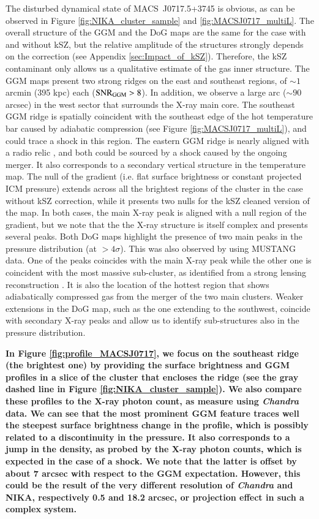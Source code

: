 \documentclass[twocolumn,traditabstract]{aa}
\begin{document}
The disturbed dynamical state of \mbox{MACS~J0717.5+3745} is obvious, as can be observed in Figure \ref{fig:NIKA_cluster_sample} and \ref{fig:MACSJ0717_multiL}. The overall structure of the GGM and the DoG maps are the same for the case with and without kSZ, but the relative amplitude of the structures strongly depends on the correction (see Appendix \ref{sec:Impact_of_kSZ}). Therefore, the kSZ contaminant only allows us a qualitative estimate of the gas inner structure. The GGM maps present two strong ridges on the east and southeast regions, of $\sim 1$ arcmin (395 kpc) each (${\rm SNR}_{\rm GGM} > 8$). In addition, we observe a large arc ($\sim 90$ arcsec) in the west sector that surrounds the X-ray main core. The southeast GGM ridge is spatially coincident with the southeast edge of the hot temperature bar caused by adiabatic compression (see Figure \ref{fig:MACSJ0717_multiL}), and could trace a shock in this region. The eastern GGM ridge is nearly aligned with a radio relic \citep[see, e.g.][]{vanWeeren2017}, and both could be sourced by a shock caused by the ongoing merger. It also corresponds to a secondary vertical structure in the temperature map. The null of the gradient (i.e. flat surface brightness or constant projected ICM pressure) extends across all the brightest regions of the cluster in the case without kSZ correction, while it presents two nulls for the kSZ cleaned version of the map. In both cases, the main X-ray peak is aligned with a null region of the gradient, but we note that the the X-ray structure is itself complex and presents several peaks. Both DoG maps highlight the presence of two main peaks in the pressure distribution (at $> 4 \sigma$). This was also observed by \cite{Mroczkowski2012} using MUSTANG data. One of the peaks coincides with the main X-ray peak while the other one is coincident with the most massive sub-cluster, as identified from a strong lensing reconstruction \citep[e.g.][]{Limousin2015}. It is also the location of the hottest region that shows adiabatically compressed gas from the merger of the two main clusters. Weaker extensions in the DoG map, such as the one extending to the southwest, coincide with secondary X-ray peaks and allow us to identify sub-structures also in the pressure distribution.

{\bf In Figure \ref{fig:profile_MACSJ0717}, we focus on the southeast ridge (the brightest one) by providing the surface brightness and GGM profiles in a slice of the cluster that encloses the ridge (see the gray dashed line in Figure \ref{fig:NIKA_cluster_sample}). We also compare these profiles to the X-ray photon count, as measure using \textit{Chandra} data. We can see that the most prominent GGM feature traces well the steepest surface brightness change in the profile, which is possibly related to a discontinuity in the pressure. It also corresponds to a jump in the density, as probed by the X-ray photon counts, which is expected in the case of a shock. We note that the latter is offset by about 7 arcsec with respect to the GGM expectation. However, this could be the result of the very different resolution of \textit{Chandra} and NIKA, respectively 0.5 and 18.2 arcsec, or projection effect in such a complex system.}
\end{document}
